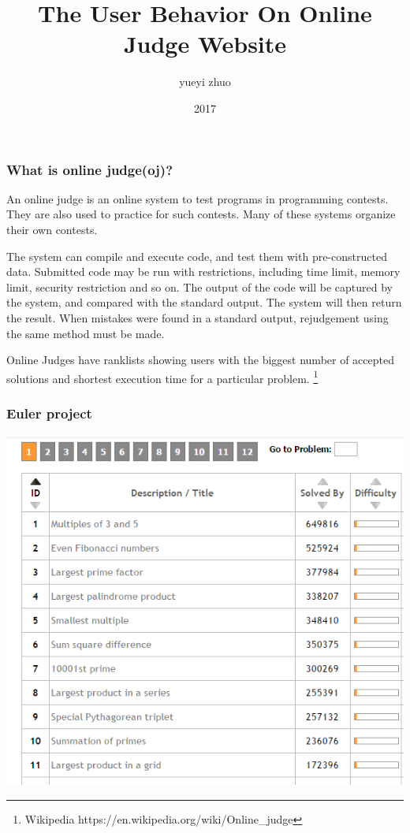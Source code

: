 \documentclass{beamer}
\title[OJ user behavior]{The User Behavior On Online Judge Website }
\author[yiyuezhuo]{yueyi zhuo}
\institute[SICNU]{School of Mathematical,Sichuan Normal University}
\date{2017}
\begin{document}
\frame{\titlepage}

\begin{frame}

\frametitle{What is online judge(oj)?}

An online judge is an online system to test programs in programming contests. They are also used to practice for such contests. Many of these systems organize their own contests.

The system can compile and execute code, and test them with pre-constructed data. Submitted code may be run with restrictions, including time limit, memory limit, security restriction and so on. The output of the code will be captured by the system, and compared with the standard output. The system will then return the result. When mistakes were found in a standard output, rejudgement using the same method must be made.

Online Judges have ranklists showing users with the biggest number of accepted solutions and shortest execution time for a particular problem. \footnote{Wikipedia https://en.wikipedia.org/wiki/Online\_judge}

\end{frame}

\begin{frame}
\frametitle{Euler project}
\includegraphics[scale=0.55]{euler-oj.png}
\end{frame}
\end{document}
